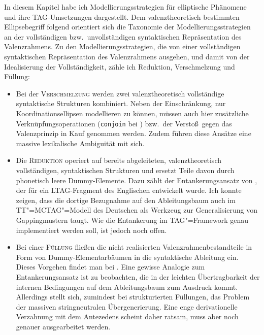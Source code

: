 In diesem Kapitel habe ich Modellierungsstrategien für elliptische Phänomene und ihre TAG-Umsetzungen dargestellt. Dem valenztheoretisch bestimmten Ellipsebegriff folgend orientiert sich die Taxonomie der Modellierungsstrategien an der vollständigen bzw.\ unvollständigen syntaktischen Repräsentation des Valenzrahmens. %
Zu den Modellierungsstrategien, die von einer vollständigen syntaktischen Repräsentation des Valenzrahmens ausgehen, und damit von der Idealisierung der Vollständigkeit, zähle ich Reduktion, Verschmelzung und Füllung:
\begin{itemize}
  \item Bei der \textsc{Verschmelzung} werden zwei valenztheoretisch vollständige syntaktische Strukturen kombiniert. Neben der Einschränkung, nur Koordinationsellipsen modellieren zu können, müssen auch hier zusätzliche Verknüpfungsoperationen ({\tt conjoin} bei \citealt{Sarkar:Joshi:96,Sarkar:Joshi:97}) bzw.\ der Versto\ss\ gegen das Valenzprinzip \citep{Seddah:08,Seddah:etal:10} in Kauf genommen werden. Zudem führen diese Ansätze eine massive lexikalische Ambiguität mit sich.  
  \item Die \textsc{Reduktion} operiert auf bereits abgeleiteten, valenztheoretisch vollständigen, syntaktischen Strukturen und ersetzt Teile davon durch phonetisch leere Dummy-Elemente. Dazu zählt der Entankerungsansatz von \cite{Lichte:Kallmeyer:10}, der für ein LTAG-Fragment des Englischen entwickelt wurde. Ich konnte zeigen, dass die dortige Bezugnahme auf den Ableitungsbaum auch im TT"=MCTAG"=Modell des Deutschen als Werkzeug zur Generalisierung von Gappingmustern taugt. Wie die Entankerung im TAG"=Framework genau implementiert werden soll, ist jedoch noch offen.
  \item Bei einer \textsc{Füllung} flie\ss en die nicht realisierten Valenzrahmenbestandteile in Form von Dummy-Elementarbäumen in die syntaktische Ableitung ein. Dieses Vorgehen findet man bei \cite{Seddah:Sagot:06}. Eine gewisse Analogie zum Entankerungsansatz ist zu beobachten, die in der leichten Übertragbarkeit der internen Bedingungen auf dem Ableitungsbaum zum Ausdruck kommt. Allerdings stellt sich, zumindest bei strukturierten Füllungen, das Problem der massiven stringneutralen Übergenerierung. Eine enge derivationelle Verzahnung mit dem Antezedens scheint daher ratsam, muss aber noch genauer ausgearbeitet werden. 
\end{itemize}
